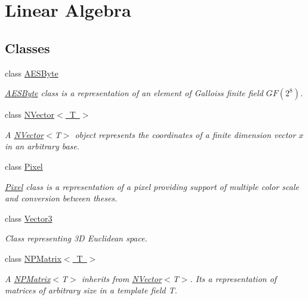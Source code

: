 \hypertarget{group___n_algebra}{}\section{Linear Algebra}
\label{group___n_algebra}
\subsection*{Classes}
\begin{DoxyCompactItemize}
\item 
class \mbox{\hyperlink{class_a_e_s_byte}{A\+E\+S\+Byte}}
\begin{DoxyCompactList}\small\item\em \mbox{\hyperlink{class_a_e_s_byte}{A\+E\+S\+Byte}} class is a representation of an element of Gallois\textquotesingle{}s finite field $ GF(2^8) $. \end{DoxyCompactList}\item 
class \mbox{\hyperlink{class_n_vector}{N\+Vector$<$ T $>$}}
\begin{DoxyCompactList}\small\item\em A {\ttfamily \mbox{\hyperlink{class_n_vector}{N\+Vector}}$<$T$>$} object represents the coordinates of a finite dimension vector $ x $ in an arbitrary base. \end{DoxyCompactList}\item 
class \mbox{\hyperlink{class_pixel}{Pixel}}
\begin{DoxyCompactList}\small\item\em \mbox{\hyperlink{class_pixel}{Pixel}} class is a representation of a pixel providing support of multiple color scale and conversion between theses. \end{DoxyCompactList}\item 
class \mbox{\hyperlink{class_vector3}{Vector3}}
\begin{DoxyCompactList}\small\item\em Class representing 3D Euclidean space. \end{DoxyCompactList}\item 
class \mbox{\hyperlink{class_n_p_matrix}{N\+P\+Matrix$<$ T $>$}}
\begin{DoxyCompactList}\small\item\em A {\ttfamily \mbox{\hyperlink{class_n_p_matrix}{N\+P\+Matrix}}$<$T$>$} inherits from {\ttfamily \mbox{\hyperlink{class_n_vector}{N\+Vector}}$<$T$>$}. It\textquotesingle{}s a representation of matrices of arbitrary size in a template field {\ttfamily T}. \end{DoxyCompactList}\end{DoxyCompactItemize}
